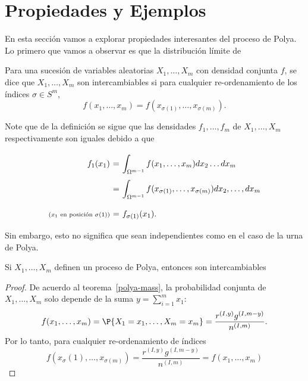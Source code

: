 \section{Propiedades y Ejemplos}

En esta sección vamos a explorar propiedades interesantes del proceso de Polya. Lo primero que vamos a observar es que la distribución límite de

\begin{definition}\label{variable}
    Para una sucesión de variables aleatorias $X_1,\ldots, X_m$ con densidad conjunta $f$, se dice que $X_1,\ldots, X_m$ son intercambiables si para cualquier re-ordenamiento de los índices $\sigma \in S^m$,
    \[ f(x_1,\ldots,x_m) = f(x_{\sigma(1)},\ldots,x_{\sigma(m)}). \]
\end{definition}

\begin{remark}
    Note que de la definición se sigue que las densidades $f_1,\ldots,f_m$ de $X_1,\ldots,X_m$ respectivamente son iguales debido a que
    \[ \everymath{\displaystyle}
    \arraycolsep=1.8pt\def\arraystretch{2.5}
    \begin{array}{rcl}
        f_1(x_1) & = & \int_{\Omega^{m-1}} f(x_1,\ldots,x_m) dx_2 \ldots dx_m\\
        & = & \int_{\Omega^{m-1}} f(x_{\sigma(1)},\ldots,x_{\sigma(m)}) dx_{2},\ldots,dx_{m}\\
       \scriptstyle{( x_{1} \text{ en posición } \sigma(1) )} & = & f_{\sigma(1)}(x_1).
    \end{array}\]
    Sin embargo, esto no significa que sean independientes como en el caso de la urna de Polya.
\end{remark}

\begin{theorem}
    Si $X_1,\ldots, X_m$ definen un proceso de Polya, entonces son intercambiables
\end{theorem}
\begin{proof}
    De acuerdo al teorema~\ref{polya-mass}, la probabilidad conjunta de $X_1,\ldots,X_m$ solo depende de la suma $y = \sum_{i=1}^m x_1$:
    \[ f(x_1,\ldots,x_m) = \P\{X_1 = x_1,\ldots, X_m = x_m\} = \frac{r^{(I,y)} g^{(I,m-y)}}{n^{(I,m)}}. \]
    Por lo tanto, para cualquier re-ordenamiento de índices
    \[ f(x_\sigma(1),\ldots,x_{\sigma(m)}) = \frac{r^{(I,y)} g^{(I,m-y)}}{n^{(I,m)}} = f(x_1,\ldots,x_m)\]
\end{proof}

